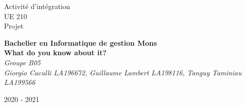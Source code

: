 \documentclass[10pt]{article}
\begin{document}
\begin{titlepage}
  \centering
  \vspace*{\fill}
  \LARGE
  Activité d'intégration\\UE 210\\Projet
  \vspace*{\fill}
  \begin{center}
    \Large
    \textbf{Bachelier en Informatique de gestion Mons\\}
    \Huge
    \textbf{What do you know about it? }\\
    \vspace*{1.5cm}
    \large
    \textit{Groupe B05\\}
    \vspace*{0.5cm}
    \textit{Giorgio Caculli LA196672, Guillaume Lambert LA198116, Tanguy Taminiau LA199566}
  \end{center}
  \vspace*{\fill}
  2020 - 2021
  \vspace*{\fill}
  \thispagestyle{fancy}
\end{titlepage}	

\newpage
\tableofcontents
\thispagestyle{fancy}





















\newpage
\printglossary
\end{document}
